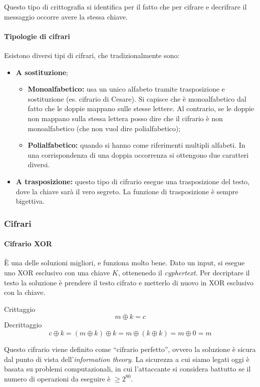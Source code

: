 Questo tipo di crittografia si identifica per il fatto che per cifrare e 
decrifrare il messaggio occorre avere la stessa chiave.

\paragraph*{Tipologie di cifrari} Esistono diversi tipi di cifrari, che 
tradizionalmente sono:
\begin{itemize}
 \item \textbf{A sostituzione};
 \begin{itemize}
  \item \textbf{Monoalfabetico:} usa un unico alfabeto tramite trasposizione e 
sostituzione (es. cifrario di Cesare). Si capisce che è monoalfabetico dal fatto 
che le doppie mappano sulle stesse lettere.
Al contrario, se le doppie non mappano sulla stessa lettera posso dire che il 
cifrario è non monoalfabetico (che non vuol dire polialfabetico);
  \item \textbf{Polialfabetico:} quando si hanno come riferimenti multipli alfabeti.
 In una corrispondenza di una doppia occorrenza si ottengono due caratteri diversi.
 \end{itemize}
 \item \textbf{A trasposizione:} questo tipo di cifrario esegue una trasposizione del testo, dove la chiave sarà 
il vero segreto. La funzione di trasposizione è sempre bigettiva. 
\end{itemize}

\subsubsection{Cifrari}

\paragraph{Cifrario XOR}

È una delle soluzioni migliori, e funziona molto bene. Dato un input, si esegue 
uno XOR esclusivo con una chiave $K$, ottenenedo il \textit{cyphertext}. Per 
decriptare il testo la soluzione è prendere il testo cifrato e metterlo di nuovo 
in XOR esclusivo con la chiave.

Crittaggio
$$
m \oplus k = c
$$
\indent Decrittaggio
$$
c \oplus k = (m \oplus k) \oplus k = m \oplus (k \oplus k) = m \oplus 0 = m
$$

Questo cifrario viene definito come ``cifrario perfetto'', ovvero la soluzione è 
sicura dal punto di vista dell'\textit{information theory}. La sicurezza a cui 
siamo legati oggi è basata su problemi computazionali, in cui l'attaccante si 
considera battutto se il numero di operazioni da eseguire è $\ge 2^{80}$.

